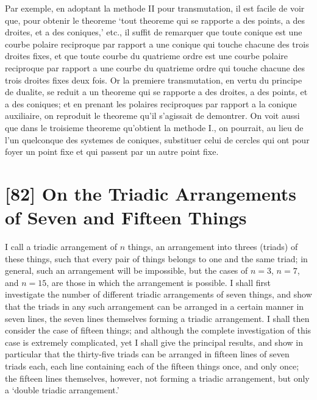 \documentclass[12pt,a4paper]{article}
\begin{document}
Par exemple, en adoptant la methode II pour transmutation, il est facile de voir que, pour obtenir le theoreme `tout theoreme qui se rapporte a des points, a des droites, et a des coniques,' etc., il suffit de remarquer que toute conique est une courbe polaire reciproque par rapport a une conique qui touche chacune des trois droites fixes, et que toute courbe du quatrieme ordre est une courbe polaire reciproque par rapport a une courbe du quatrieme ordre qui touche chacune des trois droites fixes deux fois. Or la premiere transmutation, en vertu du principe de dualite, se reduit a un theoreme qui se rapporte a des droites, a des points, et a des coniques; et en prenant les polaires reciproques par rapport a la conique auxiliaire, on reproduit le theoreme qu'il s'agissait de demontrer. On voit aussi que dans le troisieme theoreme qu'obtient la methode I., on pourrait, au lieu de l'un quelconque des systemes de coniques, substituer celui de cercles qui ont pour foyer un point fixe et qui passent par un autre point fixe.

\newpage
\section*{[82] On the Triadic Arrangements of Seven and Fifteen Things}

\bigskip

I call a triadic arrangement of $n$ things, an arrangement into threes (triads) of these things, such that every pair of things belongs to one and the same triad; in general, such an arrangement will be impossible, but the cases of $n = 3$, $n = 7$, and $n = 15$, are those in which the arrangement is possible. I shall first investigate the number of different triadic arrangements of seven things, and show that the triads in any such arrangement can be arranged in a certain manner in seven lines, the seven lines themselves forming a triadic arrangement. I shall then consider the case of fifteen things; and although the complete investigation of this case is extremely complicated, yet I shall give the principal results, and show in particular that the thirty-five triads can be arranged in fifteen lines of seven triads each, each line containing each of the fifteen things once, and only once; the fifteen lines themselves, however, not forming a triadic arrangement, but only a `double triadic arrangement.'
\end{document}
